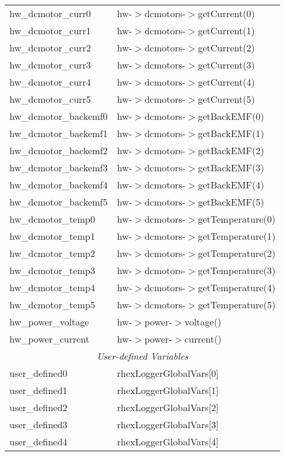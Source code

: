 \begin{center}
\begin{longtable}{|l|l|}
      hw\_dcmotor\_curr0 & hw-$>$dcmotors-$>$getCurrent(0)\\
      hw\_dcmotor\_curr1 & hw-$>$dcmotors-$>$getCurrent(1)\\
      hw\_dcmotor\_curr2 & hw-$>$dcmotors-$>$getCurrent(2)\\
      hw\_dcmotor\_curr3 & hw-$>$dcmotors-$>$getCurrent(3)\\
      hw\_dcmotor\_curr4 & hw-$>$dcmotors-$>$getCurrent(4)\\
      hw\_dcmotor\_curr5 & hw-$>$dcmotors-$>$getCurrent(5)\\
      hw\_dcmotor\_backemf0 & hw-$>$dcmotors-$>$getBackEMF(0)\\
      hw\_dcmotor\_backemf1 & hw-$>$dcmotors-$>$getBackEMF(1)\\
      hw\_dcmotor\_backemf2 & hw-$>$dcmotors-$>$getBackEMF(2)\\
      hw\_dcmotor\_backemf3 & hw-$>$dcmotors-$>$getBackEMF(3)\\
      hw\_dcmotor\_backemf4 & hw-$>$dcmotors-$>$getBackEMF(4)\\
      hw\_dcmotor\_backemf5 & hw-$>$dcmotors-$>$getBackEMF(5)\\
      hw\_dcmotor\_temp0 & hw-$>$dcmotors-$>$getTemperature(0)\\
      hw\_dcmotor\_temp1 & hw-$>$dcmotors-$>$getTemperature(1)\\
      hw\_dcmotor\_temp2 & hw-$>$dcmotors-$>$getTemperature(2)\\
      hw\_dcmotor\_temp3 & hw-$>$dcmotors-$>$getTemperature(3)\\
      hw\_dcmotor\_temp4 & hw-$>$dcmotors-$>$getTemperature(4)\\
      hw\_dcmotor\_temp5 & hw-$>$dcmotors-$>$getTemperature(5)\\
      hw\_power\_voltage & hw-$>$power-$>$voltage()\\
      hw\_power\_current & hw-$>$power-$>$current()\\
      \hline
      \multicolumn{2}{|c|}{\emph{User-defined Variables}}\\
      \hline
      user\_defined0 & rhexLoggerGlobalVars[0]\\
      user\_defined1 & rhexLoggerGlobalVars[1]\\ 
      user\_defined2 & rhexLoggerGlobalVars[2]\\
      user\_defined3 & rhexLoggerGlobalVars[3]\\
      user\_defined4 & rhexLoggerGlobalVars[4]\\ 

\end{longtable}
\end{center}
